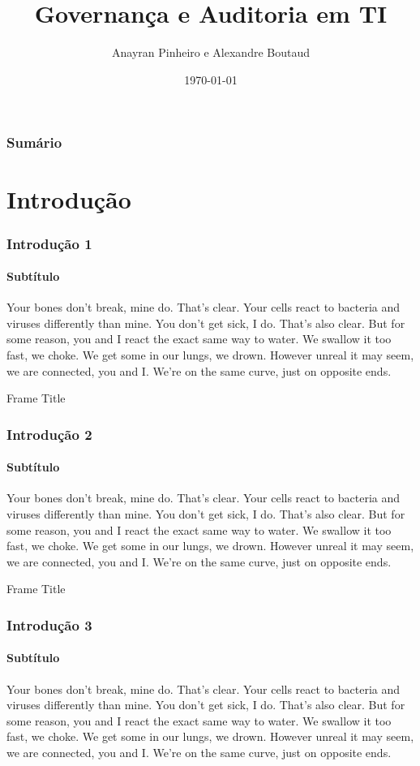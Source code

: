 \documentclass{beamer}
\title[identificação curta]{Governança e Auditoria em TI}
\author[identificação curta]{Anayran Pinheiro e Alexandre Boutaud}
\institute[UnB]{Universidade de Brasília}
\date[identificação curta]{\today}
\begin{document}
  \frame{\titlepage} %
  \begin{frame} %
    \frametitle{Sumário}
    \tableofcontents
  \end{frame}
  \section{Introdução}
  \begin{frame} %
    \frametitle{Introdução 1}
    \framesubtitle{Subtítulo}
    Your bones don't break, mine do. That's clear. Your cells react to bacteria and viruses differently than mine. You don't get sick, I do. That's also clear. But for some reason, you and I react the exact same way to water. We swallow it too fast, we choke. We get some in our lungs, we drown. However unreal it may seem, we are connected, you and I. We're on the same curve, just on opposite ends.
  \end{frame}
   
  \begin{frame}{Frame Title}
   \frametitle{Introdução 2}
    \framesubtitle{Subtítulo}
    Your bones don't break, mine do. That's clear. Your cells react to bacteria and viruses differently than mine. You don't get sick, I do. That's also clear. But for some reason, you and I react the exact same way to water. We swallow it too fast, we choke. We get some in our lungs, we drown. However unreal it may seem, we are connected, you and I. We're on the same curve, just on opposite ends.   
   \end{frame}

   \begin{frame}{Frame Title}
    \frametitle{Introdução 3}
      \framesubtitle{Subtítulo}
        Your bones don't break, mine do. That's clear. Your cells react to bacteria and viruses differently than mine. You don't get sick, I do. That's also clear. But for some reason, you and I react the exact same way to water. We swallow it too fast, we choke. We get some in our lungs, we drown. However unreal it may seem, we are connected, you and I. We're on the same curve, just on opposite ends.
  \end{frame}
  
\end{document}
